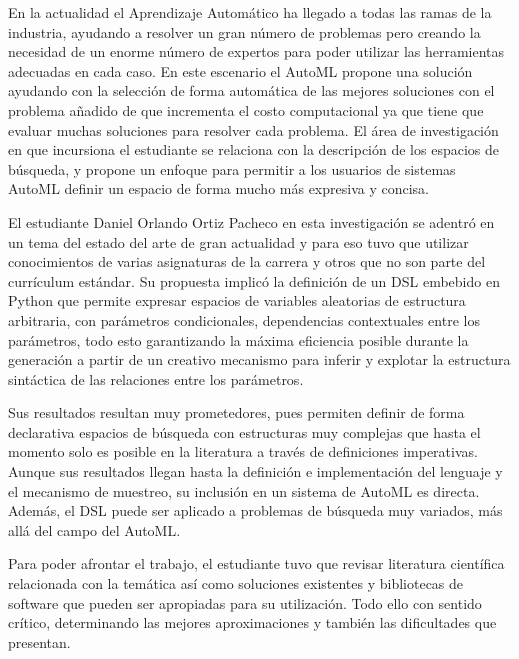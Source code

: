 \begin{opinion}
    En la actualidad el Aprendizaje Automático ha llegado a todas las ramas de la industria, 
    ayudando a resolver un gran número de problemas pero creando la necesidad de un enorme 
    número de expertos para poder utilizar las herramientas adecuadas en cada caso.
    En este escenario el AutoML propone una solución ayudando con la selección de forma 
    automática de las mejores soluciones con el problema añadido de que incrementa
    el costo computacional ya que tiene que evaluar muchas soluciones para resolver cada 
    problema. El área de investigación en que incursiona el estudiante se relaciona con 
    la descripción de los espacios de búsqueda, y propone un enfoque para permitir a los 
    usuarios de sistemas AutoML definir un espacio de forma mucho más expresiva y concisa.
    
    El estudiante Daniel Orlando Ortiz Pacheco en esta investigación se adentró en un tema 
    del estado del arte de gran actualidad y para eso tuvo que utilizar conocimientos de 
    varias asignaturas de la carrera y otros que no son parte del currículum estándar. 
    Su propuesta implicó la definición de un DSL embebido en Python que permite expresar 
    espacios de variables aleatorias de estructura arbitraria, con parámetros condicionales, 
    dependencias contextuales entre los parámetros, todo esto garantizando la máxima eficiencia 
    posible durante la generación a partir de un creativo mecanismo para inferir y explotar 
    la estructura sintáctica de las relaciones entre los parámetros.
    
    Sus resultados resultan muy prometedores, pues permiten definir de forma declarativa espacios 
    de búsqueda con estructuras muy complejas que hasta el momento solo es posible en la literatura 
    a través de definiciones imperativas. Aunque sus resultados llegan hasta la definición e 
    implementación del lenguaje y el mecanismo de muestreo, su inclusión en un sistema de AutoML 
    es directa. Además, el DSL puede ser aplicado a problemas de búsqueda muy variados, más 
    allá del campo del AutoML.
    
    Para poder afrontar el trabajo, el estudiante tuvo que revisar literatura científica 
    relacionada con la temática así como soluciones existentes y bibliotecas de software 
    que pueden ser apropiadas para su utilización. Todo ello con sentido crítico, determinando 
    las mejores aproximaciones y también las dificultades que presentan.
    

\end{opinion}
